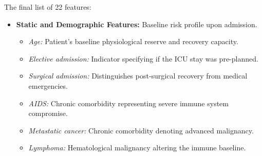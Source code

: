 The final list of 22 features:
\begin{itemize}
    \item \textbf{Static and Demographic Features:} Baseline risk profile upon admission.
          \begin{itemize}
              \item \textit{Age:} Patient's baseline physiological reserve and recovery capacity.
              \item \textit{Elective admission:} Indicator specifying if the ICU stay was pre-planned.
              \item \textit{Surgical admission:} Distinguishes post-surgical recovery from medical emergencies.
              \item \textit{AIDS:} Chronic comorbidity representing severe immune system compromise.
              \item \textit{Metastatic cancer:} Chronic comorbidity denoting advanced malignancy.
              \item \textit{Lymphoma:} Hematological malignancy altering the immune baseline.
          \end{itemize}


\end{itemize}
